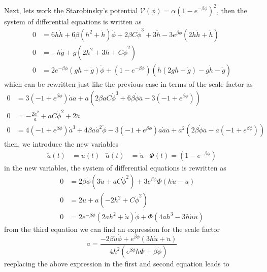 \documentclass[10pt,a4paper]{article}
\begin{document}
Next, lets work the Starobinsky's potential $\mathcal{V}(\phi) = \alpha \left(1 - e^{-\beta\phi}\right)^2$, then the system of differential equations
is written as 
\begin{align}
  0 & = 6h\dot{h} + 6\beta\left(h^2 + \dot{h}\right)\dot{\phi} + 2\beta C\dot{\phi}^3 + 3\ddot{h} - 3e^{\beta\phi}\left(2h\dot{h} + \ddot{h}\right) \\
  0 & = -h\dot{g} + g\left(2h^2 + 3\dot{h} + C\dot{\phi}^2\right) \\
  0 & =  2e^{-\beta\phi}\left(gh + \dot{g}\right)\dot{\phi} + \left(1 - e^{-\beta\phi}\right)\left(h\left(2gh + \dot{g}\right) - g\dot{h} - \ddot{g}\right)
\end{align}
which can be rewritten just like the previous case in terms of the scale factor as
\begin{align}
  0 & = 3\left(-1 + e^{\beta\phi}\right)\dot{a}\ddot{a} + a\left(2\beta a C \dot{\phi}^3 + 6 \beta \dot{\phi}\ddot{a} - 3\left(-1 + e^{\beta\phi}\right)\right) \\
  0 & = -\frac{2\dot{a}^2}{a} + aC\dot{\phi}^2 + 2\ddot{a}\\
  0 & = 4\left(-1 + e^{\beta\phi}\right)\dot{a}^3 + 4\beta a \dot{a}^2\dot{\phi} - 3\left(-1 + e^{\beta\phi}\right)a\dot{a}\ddot{a} + a^2\left(2\beta\dot{\phi}\ddot{a} - \dddot{a}\left(-1 + e^{\beta\phi}\right)\right)
\end{align}
then, we introduce the new variables
\begin{align}
  \ddot{a}(t) & = \dot{u}(t) & \dddot{a}(t) & = \ddot{u} & \Phi (t) = (1 - e^{-\beta\phi})
\end{align}
in the new variables, the system of differential equations is rewritten as
\begin{align}
  0 & = 2\beta\dot{\phi}\left(3\dot{u} + a C\dot{\phi}^2\right) + 3e^{\beta\phi}\Phi \left(h\dot{u} - \ddot{u}\right) \\
  0 & = 2\dot{u} + a\left(-2h^2 + C\dot{\phi}^2\right) \\
  0 & = 2e^{-\beta\phi}\left(2ah^2 + \dot{u}\right)\dot{\phi} + \Phi\left(4ah^3 - 3h\dot{u}\ddot{u}\right)
\end{align}
from the third equation we can find an expression for the scale factor 
\begin{equation}
  a = \frac{-2\beta\dot{u}\dot{\phi} + e^{\beta\phi}\left(3h\dot{u} + \ddot{u}\right)}{4h^2\left(e^{\beta\phi}h\Phi + \beta\dot{\phi}\right)}
\end{equation}
reeplacing the above expression in the first and second equation leads to
\end{document}
